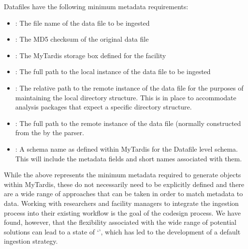 \documentclass[letterpaper,10pt,english]{sphinxmanual}
\begin{document}
\sphinxAtStartPar
Datafiles have the following minimum metadata requirements:
\begin{itemize}
\item {} 
\sphinxAtStartPar
{}: The file name of the data file to be ingested

\item {} 
\sphinxAtStartPar
{}: The MD5 checksum of the original data file

\item {} 
\sphinxAtStartPar
{}: The MyTardis storage box defined for the facility

\item {} 
\sphinxAtStartPar
{}: The full path to the local instance of the data file to be ingested

\item {} 
\sphinxAtStartPar
{}: The relative path to the remote instance of the data file for the purposes of maintaining the local directory structure. This is in place to accommodate analysis packages that expect a specific directory structure.

\item {} 
\sphinxAtStartPar
{}: The full path to the remote instance of the data file (normally constructed from the  by the parser.

\item {} 
\sphinxAtStartPar
{}: A schema name as defined within MyTardis for the Datafile level schema. This will include the metadata fields and short names associated with them.

\end{itemize}

\sphinxAtStartPar
While the above represents the minimum metadata required to generate objects within MyTardis, these do not necessarily need to be explicitly defined and there are a wide range of approaches that can be taken in order to match metadata to data. Working with researchers and facility managers to integrate the ingestion process into their existing workflow is the goal of the co\sphinxhyphen{}design process. We have found, however, that the flexibility associated with the wide range of potential solutions can lead to a state of ‘’, which has led to the development of a default ingestion strategy.
\end{document}
